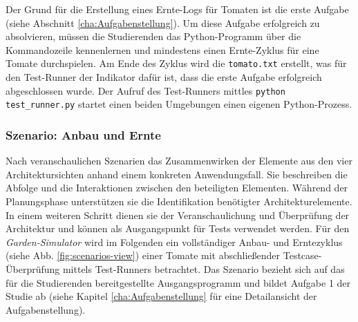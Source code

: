 Der Grund für die Erstellung eines Ernte-Logs für Tomaten ist die erste Aufgabe (siehe Abschnitt \ref{cha:Aufgabenstellung}). Um diese Aufgabe erfolgreich zu absolvieren, müssen die Studierenden das Python-Programm über die Kommandozeile kennenlernen und mindestens einen Ernte-Zyklus für eine Tomate durchspielen. Am Ende des Zyklus wird die \texttt{tomato.txt} erstellt, was für den Test-Runner der Indikator dafür ist, dass die erste Aufgabe erfolgreich abgeschlossen wurde. Der Aufruf des Test-Runners mittles \texttt{python test\_runner.py} startet einen beiden Umgebungen einen eigenen Python-Prozess.

\subsubsection{Szenario: Anbau und Ernte}

Nach \textcite[S.~9]{kruchten_41_1995} veranschaulichen Szenarien das Zusammenwirken der Elemente aus den vier Architektursichten anhand einem konkreten Anwendungsfall. Sie beschreiben die Abfolge und die Interaktionen zwischen den beteiligten Elementen. Während der Planungsphase unterstützen sie die Identifikation benötigter Architekturelemente. In einem weiteren Schritt dienen sie der Veranschaulichung und Überprüfung der Architektur und können als Ausgangspunkt für Tests verwendet werden. Für den \textit{Garden-Simulator} wird im Folgenden ein vollständiger Anbau- und Erntezyklus (siehe Abb. \ref{fig:scenarios-view}) einer Tomate mit abschließender Testcase-Überprüfung mittels Test-Runners betrachtet. Das Szenario bezieht sich auf das für die Studierenden bereitgestellte Ausgangsprogramm und bildet Aufgabe 1 der Studie ab (siehe Kapitel \ref{cha:Aufgabenstellung} für eine Detailansicht der Aufgabenstellung).

